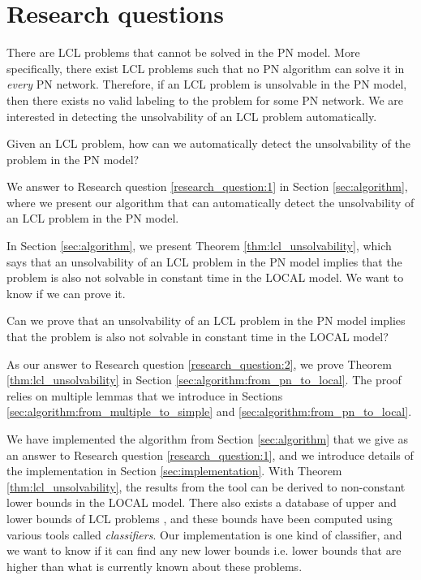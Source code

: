 
\section{Research questions} \label{sec:research_question}

There are LCL problems that cannot be solved in the PN model.
More specifically, there exist LCL problems such that no PN algorithm can solve it in \emph{every} PN network.
Therefore, if an LCL problem is unsolvable in the PN model, then there exists no valid labeling to the problem for some PN network.
We are interested in detecting the unsolvability of an LCL problem automatically.

\begin{researchquestion} \label{research_question:1}
Given an LCL problem, how can we automatically detect the unsolvability of the problem in the PN model?
\end{researchquestion}

We answer to Research question \ref{research_question:1} in Section \ref{sec:algorithm}, where we present our algorithm that can automatically detect the unsolvability of an LCL problem in the PN model.

In Section \ref{sec:algorithm}, we present Theorem \ref{thm:lcl_unsolvability}, which says that an unsolvability of an LCL problem in the PN model implies that the problem is also not solvable in constant time in the LOCAL model.
We want to know if we can prove it.

\begin{researchquestion} \label{research_question:2}
Can we prove that an unsolvability of an LCL problem in the PN model implies that the problem is also not solvable in constant time in the LOCAL model?
\end{researchquestion}

As our answer to Research question \ref{research_question:2}, we prove Theorem \ref{thm:lcl_unsolvability} in Section \ref{sec:algorithm:from_pn_to_local}.
The proof relies on multiple lemmas that we introduce in Sections \ref{sec:algorithm:from_multiple_to_simple} and \ref{sec:algorithm:from_pn_to_local}.

We have implemented the algorithm from Section \ref{sec:algorithm} that we give as an answer to Research question \ref{research_question:1}, and we introduce details of the implementation in Section \ref{sec:implementation}.
With Theorem \ref{thm:lcl_unsolvability}, the results from the tool can be derived to non-constant lower bounds in the LOCAL model.
There also exists a database of upper and lower bounds of LCL problems \cite{Tereshchenko2021}, and these bounds have been computed using various tools called \emph{classifiers}.
Our implementation is one kind of classifier, and we want to know if it can find any new lower bounds i.e. lower bounds that are higher than what is currently known about these problems.

